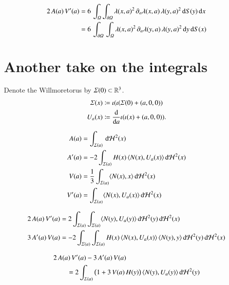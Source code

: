 \begin{align*}
		2 \, A(a) \, V'(a)
	&=
	6 \, \int_\varOmega \int_{\partial\varOmega}
		\lambda(x,a)^2 \, \partial_a\lambda(x,a) \, \lambda(y,a)^2
	\, {\operatorname{d}} S(y) \, {\operatorname{d}} x
	\\
	&=
	6 \, \int_{\partial\varOmega} \, \int_\varOmega
		\lambda(x,a)^2 \, \partial_a\lambda(y,a) \, \lambda(y,a)^2
	\, {\operatorname{d}} y \, {\operatorname{d}} S(x)	
\end{align*}


\newpage

\section{Another take on the integrals}

Denote the Willmoretorus by $\varSigma(0) \subset {\mathbb{R}}^3$.
\begin{align*}
	\varSigma(x) &\coloneqq \iota( \iota(\varSigma(0) + (a,0,0)) 
	\\
	U_a(x) &\coloneqq \frac{{\operatorname{d}}}{{\operatorname{d}} a} \iota( \iota(x) + (a,0,0)).
\end{align*}

\begin{align*}
	A(a) &= \int_{\varSigma(a)} \, {\operatorname{d}} \mathcal{H}^2(x)
	\\
	A'(a) &= -2 \int_{\varSigma(a)} H(x) \,  \langle N(x), U_a(x)  \rangle \, {\operatorname{d}} \mathcal{H}^2(x)	
	\\
	V(a) &= \frac{1}{3}
	\int_{\varSigma(a)}  \langle N(x) , x \rangle \, {\operatorname{d}} \mathcal{H}^2(x)	
	\\
	V'(a) &=
	\int_{\varSigma(a)}  \langle N(x) ,  U_a(x) \rangle \, {\operatorname{d}} \mathcal{H}^2(x)		
\end{align*}

\begin{align*}
	2 \, A(a) \, V'(a)	
	&=
	2
	\int_{\varSigma(a)} 	\int_{\varSigma(a)} 
		 \langle N(y) ,  U_a(y) \rangle
	\, {\operatorname{d}} \mathcal{H}^2(y)
	\, {\operatorname{d}} \mathcal{H}^2(x)
	\\
	3 \, A'(a) \, V(a)
	&=
		- 2 \int_{\varSigma(a)} \int_{\varSigma(a)}
		H(x) \, \langle N(x), U_a(x)  \rangle \,  \langle N(y) , y \rangle 
		\, {\operatorname{d}} \mathcal{H}^2(y)	 \, {\operatorname{d}} \mathcal{H}^2(x)	
\end{align*}

\begin{align*}
	\MoveEqLeft
	2 \, A(a) \, V'(a) - 3 \, A'(a) \, V(a)
	\\
	&=
	2
	\int_{\varSigma(a)}
	\bigparen{
		1 + 3 \, V(a) \, H(y)
	}
	\,
	\ninnerprod{N(y),  U_a(y)}
	\, \dd \HausdorffMeasure^2(y)
\end{align*}